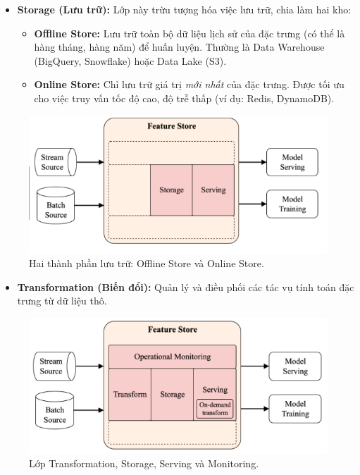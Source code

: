 \documentclass[11pt]{article}
\begin{document}
\begin{itemize}
    \item \textbf{Storage (Lưu trữ):} Lớp này trừu tượng hóa việc lưu trữ, chia làm hai kho:
    \begin{itemize}
        \item \textbf{Offline Store:} Lưu trữ toàn bộ dữ liệu lịch sử của đặc trưng (có thể là hàng tháng, hàng năm) để huấn luyện. Thường là Data Warehouse (BigQuery, Snowflake) hoặc Data Lake (S3).
        \item \textbf{Online Store:} Chỉ lưu trữ giá trị \textit{mới nhất} của đặc trưng. Được tối ưu cho việc truy vấn tốc độ cao, độ trễ thấp (ví dụ: Redis, DynamoDB).
    \end{itemize}
\end{itemize}
\begin{figure}[H]
    \centering
    \includegraphics[width=0.7\linewidth]{images/storage_feast.png}
    \caption{Hai thành phần lưu trữ: Offline Store và Online Store.}
\end{figure}

\begin{itemize}
    \item \textbf{Transformation (Biến đổi):} Quản lý và điều phối các tác vụ tính toán đặc trưng từ dữ liệu thô.
\end{itemize}
\begin{figure}[H]
    \centering
    \includegraphics[width=0.7\linewidth]{images/transform_feast.png}
    \caption{Lớp Transformation, Storage, Serving và Monitoring.}
\end{figure}
\end{document}
